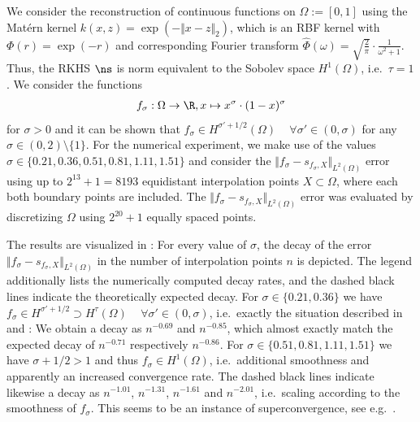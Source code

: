 \documentclass[a4paper, 10pt]{article}
\begin{document}
\begin{example} %
We consider the reconstruction of continuous functions on $\Omega := [0, 1]$ using the Matérn kernel $k(x, z) = \exp(-\Vert x - z \Vert_2)$,
 which is an RBF kernel with $\Phi(r) = \exp(-r)$ and corresponding Fourier transform $\hat{\Phi}(\omega) = \sqrt{\frac{2}{\pi}} \cdot \frac{1}{\omega^2 + 1}$.
Thus, the RKHS $\ns$ is norm equivalent to the Sobolev space $H^1(\Omega)$, i.e.\ $\tau = 1$.
We consider the functions
\begin{align*}
f_\sigma: \Omega \rightarrow \R, x \mapsto x^\sigma \cdot (1-x)^\sigma
\end{align*}
for $\sigma > 0$ and it can be shown that $f_\sigma \in H^{\sigma' + 1/2}(\Omega)$ ~ $\forall \sigma' \in (0, \sigma)$ for any $\sigma \in (0, 2) \setminus \{ 1 \}$.
%
For the numerical experiment, we make use of the values %
$\sigma \in \{ 0.21, 0.36, 0.51, 0.81, 1.11, 1.51 \}$ 
and consider the $\Vert f_\sigma - s_{f_\sigma, X} \Vert_{L^2(\Omega)}$ error using up to $2^{13} + 1 = 8193$ equidistant interpolation points $X \subset \Omega$,
where each both boundary points are included.
The $\Vert f_\sigma - s_{f_\sigma, X} \Vert_{L^2(\Omega)}$ error was evaluated by discretizing $\Omega$ using $2^{20} + 1$ equally spaced points.

The results are visualized in :
For every value of $\sigma$, the decay of the error $\Vert f_\sigma - s_{f_\sigma, X} \Vert_{L^2(\Omega)}$ in the number of interpolation points $n$ is depicted.
The legend additionally lists the numerically computed decay rates,
and the dashed black lines indicate the theoretically expected decay.
For $\sigma \in \{ 0.21, 0.36 \}$ we have $f_\sigma \in H^{\sigma' + 1/2} \supset H^\tau(\Omega)$ ~ $\forall \sigma' \in (0, \sigma)$, 
i.e.\ exactly the situation described in  and : 
We obtain a decay as $n^{-0.69}$ and $n^{-0.85}$, which almost exactly match the expected decay of $n^{-0.71}$ respectively $n^{-0.86}$.
For $\sigma \in \{ 0.51, 0.81, 1.11, 1.51 \}$ we have $\sigma + 1/2 > 1$ and thus $f_\sigma \in H^1(\Omega)$, 
i.e.\ additional smoothness and apparently an increased convergence rate. %
The dashed black lines indicate likewise a decay as $n^{-1.01}$, $n^{-1.31}$, $n^{-1.61}$ and $n^{-2.01}$, i.e.\ scaling according to the smoothness of $f_\sigma$.
This seems to be an instance of superconvergence, see e.g.\ \cite{schaback2018superconvergence}.

%



\end{example}
\end{document}
